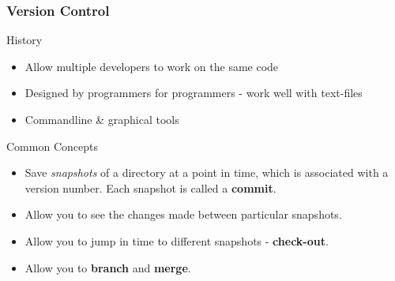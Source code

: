 \documentclass{beamer}
\begin{document}
\begin{frame}
\frametitle{Version Control}

\begin{block}
{History}
\begin{itemize}
\item Allow multiple developers to work on the same code
\item Designed by programmers for programmers - work well with text-files
\item Commandline \& graphical tools

\end{itemize}
\end{block}


\begin{block}
{Common Concepts}
\begin{itemize}
\item Save \emph{snapshots} of a directory at a point in time, which is associated with a version number. Each snapshot is called a {\bf{commit}}. 
\item Allow you to see the changes made between particular snapshots.
\item Allow you to jump in time to different snapshots - {\bf{check-out}}. 
\item Allow you to {\bf{branch}} and {\bf{merge}}.
\end{itemize}
\end{block}
\end{frame}
\end{document}
